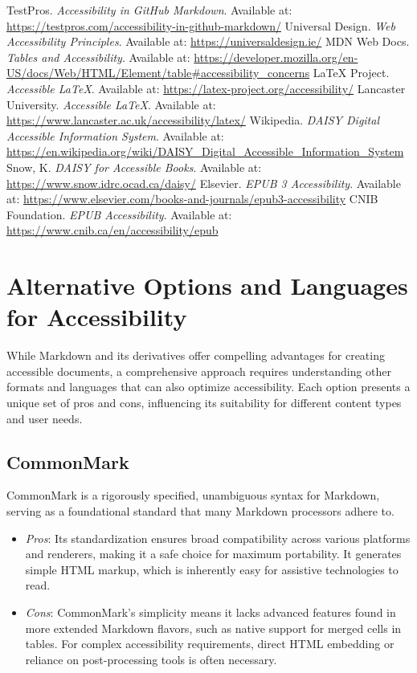 \begin{thebibliography}{99}
 TestPros. \textit{Accessibility in GitHub Markdown}. Available at: \url{https://testpros.com/accessibility-in-github-markdown/}
 Universal Design. \textit{Web Accessibility Principles}. Available at: \url{https://universaldesign.ie/}
 MDN Web Docs. \textit{Tables and Accessibility}. Available at: \url{https://developer.mozilla.org/en-US/docs/Web/HTML/Element/table#accessibility_concerns}
 LaTeX Project. \textit{Accessible LaTeX}. Available at: \url{https://latex-project.org/accessibility/}
 Lancaster University. \textit{Accessible LaTeX}. Available at: \url{https://www.lancaster.ac.uk/accessibility/latex/}
 Wikipedia. \textit{DAISY Digital Accessible Information System}. Available at: \url{https://en.wikipedia.org/wiki/DAISY_Digital_Accessible_Information_System}
 Snow, K. \textit{DAISY for Accessible Books}. Available at: \url{https://www.snow.idrc.ocad.ca/daisy/}
 Elsevier. \textit{EPUB 3 Accessibility}. Available at: \url{https://www.elsevier.com/books-and-journals/epub3-accessibility}
 CNIB Foundation. \textit{EPUB Accessibility}. Available at: \url{https://www.cnib.ca/en/accessibility/epub}
\end{thebibliography}

\section{Alternative Options and Languages for Accessibility}
\label{sec:alt-options-accessibility}

While Markdown and its derivatives offer compelling advantages for creating accessible documents, a comprehensive approach requires understanding other formats and languages that can also optimize accessibility. Each option presents a unique set of pros and cons, influencing its suitability for different content types and user needs.

\subsection{CommonMark}
CommonMark is a rigorously specified, unambiguous syntax for Markdown, serving as a foundational standard that many Markdown processors adhere to. \cite{MarkdownGuideExtended, DocsToMarkdown, QuartoCommonMark}
\begin{itemize}
    \item \emph{Pros}: Its standardization ensures broad compatibility across various platforms and renderers, making it a safe choice for maximum portability. \cite{QuartoCommonMark, MConverter} It generates simple HTML markup, which is inherently easy for assistive technologies to read. \cite{SmashingMagazine}
    \item \emph{Cons}: CommonMark's simplicity means it lacks advanced features found in more extended Markdown flavors, such as native support for merged cells in tables. \cite{DocsToMarkdown} For complex accessibility requirements, direct HTML embedding or reliance on post-processing tools is often necessary. \cite{DocsToMarkdown}
\end{itemize}

